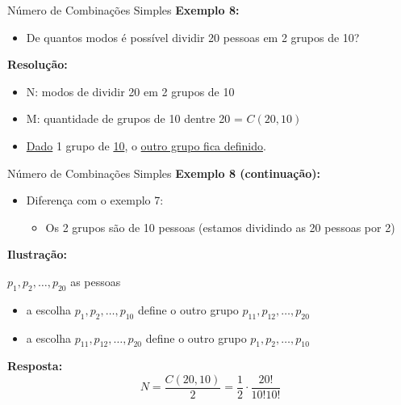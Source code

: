 \documentclass[aspectratio=169]{beamer}
\begin{document}
\begin{frame}{Número de Combinações Simples}
    \textbf{Exemplo 8:}
    \begin{itemize}
        \item De quantos modos é possível dividir 20 pessoas em 2 grupos de 10?
    \end{itemize}

    \pause
    \vspace{2mm}

    \textbf{Resolução:}

    \begin{itemize}
        \item N: modos de dividir 20 em 2 grupos de 10 \pause
        \item M: quantidade de grupos de 10 dentre 20 = $C(20,10)$ \pause
        \item \underline{Dado} 1 grupo de \underline{10}, o \underline{outro grupo fica definido}.
    \end{itemize}

\end{frame}

\begin{frame}{Número de Combinações Simples}
    \textbf{Exemplo 8 (continuação):}
    \begin{itemize}
        \item Diferença com o exemplo 7:
        \begin{itemize}
            \item Os 2 grupos são de 10 pessoas (estamos dividindo as 20 pessoas por 2)
        \end{itemize}
    \end{itemize}

    \pause
    \vspace{2mm}

    \textbf{Ilustração:}

    \begin{center}
        $p_1, p_2, \ldots, p_{20}$ as pessoas
    \end{center}

    \begin{itemize}
        \item a escolha $p_1, p_2, \ldots, p_{10}$ define o outro grupo $p_{11}, p_{12}, \ldots, p_{20}$
        \item a escolha $p_{11}, p_{12}, \ldots, p_{20}$ define o outro grupo  $p_1, p_2, \ldots, p_{10}$ 
    \end{itemize}

    \pause
    \vspace{2mm}

    \textbf{Resposta:}
    $$ N = \frac{C(20,10)}{2} = \frac{1}{2} \cdot \frac{20!}{10! 10!}$$
\end{frame}
\end{document}
